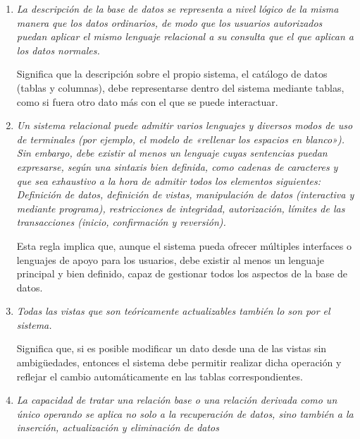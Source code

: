 \begin{enumerate}[start=0]
    Esta regla indica que el sistema debe ser capaz de representar a los valores nulos de forma universal, independientemente de la tabla en la que falta la información. Esta regla resulta útil al momento de implementar restricciones en las que algunos datos no pueden ser nulos (Como las llaves), garantizando la integridad de los datos.
    
    \item \textit{La descripción de la base de datos se representa a nivel lógico de la misma manera que los datos ordinarios, de modo que los usuarios autorizados puedan aplicar el mismo lenguaje relacional a su consulta que el que aplican a los datos normales.}\cite{Codd1985}
    
    Significa que la descripción sobre el propio sistema, el catálogo de datos (tablas y columnas), debe representarse dentro del sistema mediante tablas, como si fuera otro dato más con el que se puede interactuar.
    
    \item \textit{Un sistema relacional puede admitir varios lenguajes y diversos modos de uso de terminales (por ejemplo, el modelo de «rellenar los espacios en blanco»). Sin embargo, debe existir al menos un lenguaje cuyas sentencias puedan expresarse, según una sintaxis bien definida, como cadenas de caracteres y que sea exhaustivo a la hora de admitir todos los elementos siguientes:
    Definición de datos, definición de vistas, manipulación de datos (interactiva y mediante programa), restricciones de integridad,  autorización, límites de las transacciones (inicio, confirmación y reversión).} \cite{Codd1985}
    
    Esta regla implica que, aunque el sistema pueda ofrecer múltiples interfaces o lenguajes de apoyo para los usuarios, debe existir al menos un lenguaje principal y bien definido, capaz de gestionar todos los aspectos de la base de datos.
    
    \item \textit{Todas las vistas que son teóricamente actualizables también lo son por el sistema.}\cite{Codd1985}

    Significa que, si es posible modificar un dato desde una de las vistas sin ambigüedades, entonces el sistema debe permitir realizar dicha operación y reflejar el cambio automáticamente en las tablas correspondientes.

    \item \textit{La capacidad de tratar una relación base o una relación derivada como un único operando se aplica no solo a la recuperación de datos, sino también a la inserción, actualización y eliminación de datos}\cite{Codd1985}
    

\end{enumerate}
